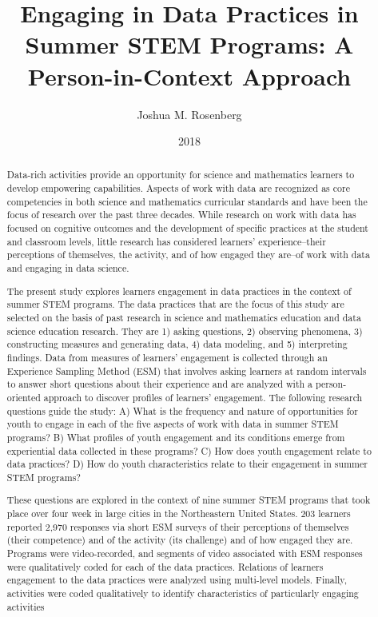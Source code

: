 \documentclass[]{msu-thesis}
\title{Engaging in Data Practices in Summer STEM Programs: A Person-in-Context Approach
}
\author{Joshua M. Rosenberg}
\date{2018}
\theoremstyle{definition}
\theoremstyle{definition}
\theoremstyle{definition}
\theoremstyle{remark}
\begin{document}

\maketitlepage
\begin{abstract}
Data-rich activities provide an opportunity for science and mathematics learners to develop empowering capabilities. Aspects of work with data are recognized as core competencies in both science and mathematics curricular standards and have been the focus of research over the past three decades. While research on work with data has focused on cognitive outcomes and the development of specific practices at the student and classroom levels, little research has considered learners' experience--their perceptions of themselves, the activity, and of how engaged they are--of work with data and engaging in data science.

The present study explores learners engagement in data practices in the context of summer STEM programs. The data practices that are the focus of this study are selected on the basis of past research in science and mathematics education and data science education research. They are 1) asking questions, 2) observing phenomena, 3) constructing measures and generating data, 4) data modeling, and 5) interpreting findings. Data from measures of learners' engagement is collected through an Experience Sampling Method (ESM) that involves asking learners at random intervals to answer short questions about their experience and are analyzed with a person-oriented approach to discover profiles of learners' engagement. The following research questions guide the study: A) What is the frequency and nature of opportunities for youth to engage in each of the five aspects of work with data in summer STEM programs? B) What profiles of youth engagement and its conditions emerge from experiential data collected in these programs? C) How does youth engagement relate to data practices? D) How do youth characteristics relate to their engagement in summer STEM programs?

These questions are explored in the context of nine summer STEM programs that took place over four week in large cities in the Northeastern United States. 203 learners reported 2,970 responses via short ESM surveys of their perceptions of themselves (their competence) and of the activity (its challenge) and of how engaged they are. Programs were video-recorded, and segments of video associated with ESM responses were qualitatively coded for each of the data practices. Relations of learners engagement to the data practices were analyzed using multi-level models. Finally, activities were coded qualitatively to identify characteristics of particularly engaging activities


\end{abstract}
\end{document}
